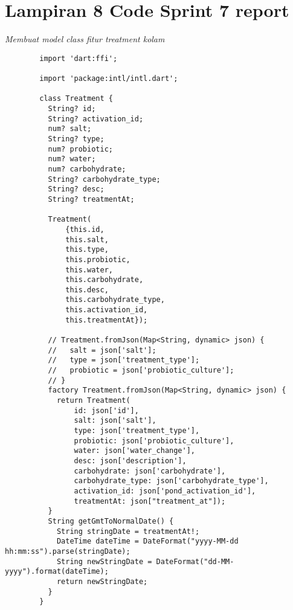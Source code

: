 	\section{Lampiran 8 Code Sprint 7 report}
	\textit{Membuat model class fitur treatment kolam}
	\begin{lstlisting}
        import 'dart:ffi';

        import 'package:intl/intl.dart';
        
        class Treatment {
          String? id;
          String? activation_id;
          num? salt;
          String? type;
          num? probiotic;
          num? water;
          num? carbohydrate;
          String? carbohydrate_type;
          String? desc;
          String? treatmentAt;
        
          Treatment(
              {this.id,
              this.salt,
              this.type,
              this.probiotic,
              this.water,
              this.carbohydrate,
              this.desc,
              this.carbohydrate_type,
              this.activation_id,
              this.treatmentAt});
        
          // Treatment.fromJson(Map<String, dynamic> json) {
          //   salt = json['salt'];
          //   type = json['treatment_type'];
          //   probiotic = json['probiotic_culture'];
          // }
          factory Treatment.fromJson(Map<String, dynamic> json) {
            return Treatment(
                id: json['id'],
                salt: json['salt'],
                type: json['treatment_type'],
                probiotic: json['probiotic_culture'],
                water: json['water_change'],
                desc: json['description'],
                carbohydrate: json['carbohydrate'],
                carbohydrate_type: json['carbohydrate_type'],
                activation_id: json['pond_activation_id'],
                treatmentAt: json["treatment_at"]);
          }
          String getGmtToNormalDate() {
            String stringDate = treatmentAt!;
            DateTime dateTime = DateFormat("yyyy-MM-dd hh:mm:ss").parse(stringDate);
            String newStringDate = DateFormat("dd-MM-yyyy").format(dateTime);
            return newStringDate;
          }
        }
        
	\end{lstlisting}
	
